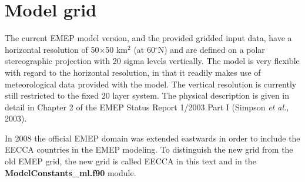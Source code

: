 \section{Model grid}
\label{sec:ModelGrid}

The current EMEP model version, and the provided gridded input data,
have a horizontal resolution of 50$\times$50 km$^2$ (at 60$^\circ$N)
and are defined on a
polar stereographic projection with 20 sigma levels vertically. 
The model is very flexible with regard to the horizontal
resolution, in that it readily makes use of 
meteorological data provided with the model. The vertical
resolution is currently still restricted to the fixed 20 layer
system. The physical
description is given in detail in Chapter 2 of the EMEP Status Report
1/2003 Part I (Simpson {\sl et al.}, 2003).

In 2008 the official EMEP domain was extended eastwards in order to include the 
EECCA countries in the EMEP modeling. To distinguish the new grid from the old EMEP 
grid, the new grid is called EECCA in this text and in the { \bf ModelConstants\_ml.f90} module.

